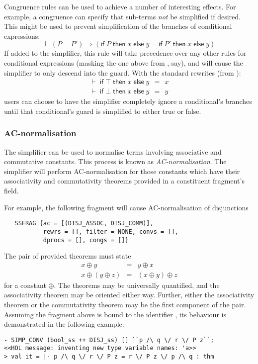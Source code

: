 Congruence rules can be used to achieve a number of interesting
effects.  For example, a congruence can specify that sub-terms
\emph{not} be simplified if desired.  This might be used to prevent
simplification of the branches of conditional expressions:
\[
\vdash (P = P') \Rightarrow
       (\textsf{if}\;P\;\textsf{then}\;x\;\textsf{else}\;y =
       \textsf{if}\;P'\;\textsf{then}\;x\;\textsf{else}\;y)
\]
If added to the simplifier, this rule will take precedence over any
other rules for conditional expressions (masking the one above from
, say), and will cause the simplifier to only descend
into the guard.  With the standard rewrites (from ):
\[
\begin{array}{l}
\vdash \;\textsf{if}\;\top\;\textsf{then}\;x\;\textsf{else}\;y \,\;=\,\; x\\
\vdash \;\textsf{if}\;\bot\;\textsf{then}\;x\;\textsf{else}\;y \,\;=\,\; y
\end{array}
\]
users can choose to have the simplifier completely ignore
a conditional's branches until that conditional's guard is simplified
to either true or false.


\subsubsection{AC-normalisation}

The simplifier can be used to normalise terms involving associative
and commutative constants.  This process is known as
\emph{AC-normalisation}.  The simplifier will perform AC-normalisation
for those constants which have their associativity and commutativity
theorems provided in a constituent \simpset{} fragment's 
field.

For example, the following \simpset{} fragment will cause
AC-normalisation of disjunctions
\begin{hol}
\begin{verbatim}
   SSFRAG {ac = [(DISJ_ASSOC, DISJ_COMM)],
           rewrs = [], filter = NONE, convs = [],
           dprocs = [], congs = []}
\end{verbatim}
\end{hol}
The pair of provided theorems must state
\begin{eqnarray*}
x \oplus y &=& y \oplus x\\
x \oplus (y \oplus z) &=& (x \oplus y) \oplus z
\end{eqnarray*}
for a constant $\oplus$.  The theorems may be universally quantified,
and the associativity theorem may be oriented either way.  Further,
either the associativity theorem or the commutativity theorem may be
the first component of the pair.  Assuming the \simpset{} fragment
above is bound to the \ML{} identifier , its behaviour is
demonstrated in the following example:
\begin{session}
\begin{verbatim}
- SIMP_CONV (bool_ss ++ DISJ_ss) [] ``p /\ q \/ r \/ P z``;
<<HOL message: inventing new type variable names: 'a>>
> val it = |- p /\ q \/ r \/ P z = r \/ P z \/ p /\ q : thm
\end{verbatim}
\end{session}

